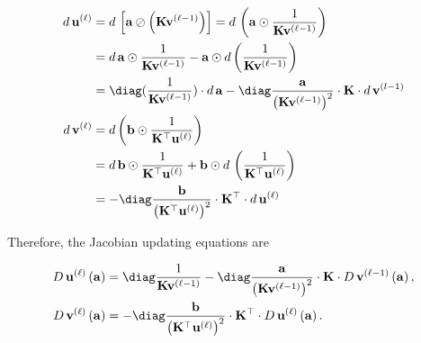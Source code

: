 \begin{equation*}
  \begin{aligned}
    d\,\mathbf{u}^{(\ell)}
     & = d\, \left[
      \mathbf{a} \oslash \left(\mathbf{K}\mathbf{v}^{(\ell-1)}\right)
      \right]
    = d\, \left(
    \mathbf{a} \odot \frac1{\mathbf{K}\mathbf{v}^{(\ell-1)}}
    \right)                                                                                                             \\
     & = d\, \mathbf{a} \odot \frac1{\mathbf{K}\mathbf{v}^{(\ell-1)}}
    - \mathbf{a} \odot d\left(\frac1{\mathbf{K}\mathbf{v}^{(\ell-1)}}\right)                                            \\
     & = \diag(\frac1{\mathbf{K}\mathbf{v}^{(\ell-1)}})\cdot d\,\mathbf{a}
    - \diag \frac{\mathbf{a}}{\left(\mathbf{K}\mathbf{v}^{(\ell-1)}\right)^2}\cdot\mathbf{K}\cdot d\,\mathbf{v}^{(l-1)} \\
    d\, \mathbf{v}^{(\ell)}
     & = d \left(\mathbf{b}\odot \frac1{\mathbf{K}^\top \mathbf{u}^{(\ell)}}\right)                                     \\
     & = d\,\mathbf{b}\odot\frac1{\mathbf{K}^\top \mathbf{u}^{(\ell)}}
    + \mathbf{b}\odot d\,\left(\frac1{\mathbf{K}^\top \mathbf{u}^{(\ell)}}\right)                                       \\
     & = - \diag \frac{\mathbf{b}}{\left(\mathbf{K}^\top \mathbf{u}^{(\ell)}\right)^2}
    \cdot\mathbf{K}^\top \cdot d\, \mathbf{u}^{(\ell)}
  \end{aligned}
\end{equation*}

Therefore, the Jacobian updating equations are

\begin{update}\label{update:jacobian-vanilla-sinkhorn}
  \begin{equation}\label{eqn:jacobian-vanilla-sinkhorn}
    \begin{aligned}
      D\,\mathbf{u}^{(\ell)}\left(\mathbf{a}\right)
       & = \diag\frac1{\mathbf{K}\mathbf{v}^{(\ell-1)}}
      - \diag \frac{\mathbf{a}}{\left(\mathbf{K}\mathbf{v}^{(\ell-1)}\right)^2}\cdot\mathbf{K}\cdot
      D\,\mathbf{v}^{(\ell-1)}\left(\mathbf{a}\right),                                   \\
      D\,\mathbf{v}^{(\ell)}\left(\mathbf{a}\right)
       & = - \diag \frac{\mathbf{b}}{\left(\mathbf{K}^\top \mathbf{u}^{(\ell)}\right)^2}
      \cdot\mathbf{K}^\top \cdot
      D\,\mathbf{u}^{(\ell)}\left(\mathbf{a}\right).
    \end{aligned}
  \end{equation}
\end{update}

